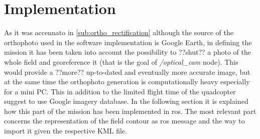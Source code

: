 \section{Implementation} %
\label{sec:implementation}
As it was accennato in \ref{sub:ortho_rectification} although the source of the orthophoto used in the software implementation is Google Earth, in defining the mission it has been taken into account the possibility to ??shut?? a photo of the whole field and georeference it (that is the goal of \textit{/optical\_cam} node). This would provide a ??more?? up-to-dated and eventually more accurate image, but at the same time the orthophoto generation is computationally heavy especially for a mini PC. This in addition to the limited flight time of the quadcopter suggest to use Google imagery database.
In the following section it is explained how this part of the mission has been implemented in \acrshort{ros}. The most relevant part concerns the representation of the field contour as \acrshort{ros} message and the way to import it given the respective KML file.

